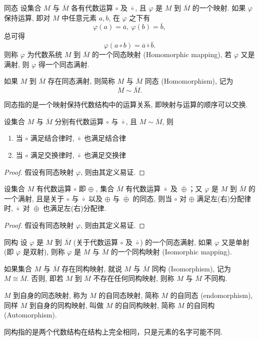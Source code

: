 \documentclass[cn,toc=twocol]{elegantbook}
\newcommand{\ITEMS}{\begin{enumerate}}
\newcommand{\ITEME}{\end{enumerate}}
\begin{document}
\begin{definition}{同态}{}
设集合 $M$ 与 $\overline{M}$ 各有代数运算 $\circ$ 及 $\overline{\circ}$, 且 $\varphi$ 是 $M$ 到 $\overline{M}$ 的一个映射. 如果 $\varphi$ 保持运算, 即对 $M$ 中任意元素 $a, b$, 在 $\varphi$ 之下有
\[
	\varphi(a) = \overline{a}, \ \varphi(b) = \overline{b},
\]
总可得
\[
	\varphi(a \circ b) = \overline{a} \overline{\circ} \overline{b}.
\]
则称 $\varphi$ 为代数系统 $M$ 到 $\overline{M}$ 的一个同态映射 (Homomorphic mapping), 若 $\varphi$ 又是满射, 则 $\varphi$ 得一个同态满射.

如果 $M$ 到 $\overline{M}$ 存在同态满射, 则简称 $M$ 与 $\overline{M}$ 同态 (Homomorphism), 记为
\[
	M\sim\overline{M}.
\]

同态指的是一个映射保持代数结构中的运算关系, 即映射与运算的顺序可以交换.
\end{definition}

\begin{theorem}
	设集合 $M$ 与 $\overline{M}$ 分别有代数运算 $\circ$ 与 $\overline{\circ}$, 且 $M \sim \overline{M}$, 则
	\ITEMS
		\item 当 $\circ$ 满足结合律时, $\overline{\circ}$ 也满足结合律
		\item 当 $\circ$ 满足交换律时, $\overline{\circ}$ 也满足交换律
	\ITEME
\end{theorem}

\begin{proof}
	假设有同态映射 $\varphi$, 则由其定义易证.
\end{proof}


\begin{theorem}
	设集合 $M$ 有代数运算 $\circ$ 即 $\oplus$ , 集合 $\overline{M}$ 有代数运算 $\overline{\circ}$ 及 $\overline{\oplus}$；又 $\varphi$ 是 $M$ 到 $\overline{M}$ 的一个满射, 且是关于 $\circ$ 与 $\overline{\circ}$ 以及 $\oplus$ 与 $\overline{\oplus}$ 的同态, 则当 $\circ$ 对 $\oplus$ 满足左(右)分配律时, $\overline{\circ}$ 对 $\overline{\oplus}$ 也满足左(右)分配律.
\end{theorem}

\begin{proof}
	假设有同态映射 $\varphi$, 则由其定义易证.
\end{proof}

\begin{definition}{同构}
设 $\varphi$ 是 $M$ 到 $\overline{M}$ (关于代数运算 $\circ$ 及 $\overline{\circ}$) 的一个同态满射, 如果 $\varphi$ 又是单射 (即 $\varphi$ 是双射), 则称 $\varphi$ 是 $M$ 与 $\overline{M}$ 的一个同构映射 (Isomorphic mapping).

如果集合 $M$ 与 $\overline{M}$ 存在同构映射, 就说 $M$ 与 $\overline{M}$ 同构 (Isomorphism), 记为 $M \cong \overline{M}$. 否则, 即若 $M$ 到 $\overline{M}$ 不存在任何同构映射, 则称 $M$ 与 $\overline{M}$ 不同构.

$M$ 到自身的同态映射, 称为 $M$ 的自同态映射, 简称 $M$ 的自同态 (endomorphism), 同样 $M$ 到自身的同构映射, 叫做 $M$ 的自同构映射, 简称 $M$ 的自同构 (Automorphism).

同构指的是两个代数结构在结构上完全相同，只是元素的名字可能不同.
\end{definition}
\end{document}
